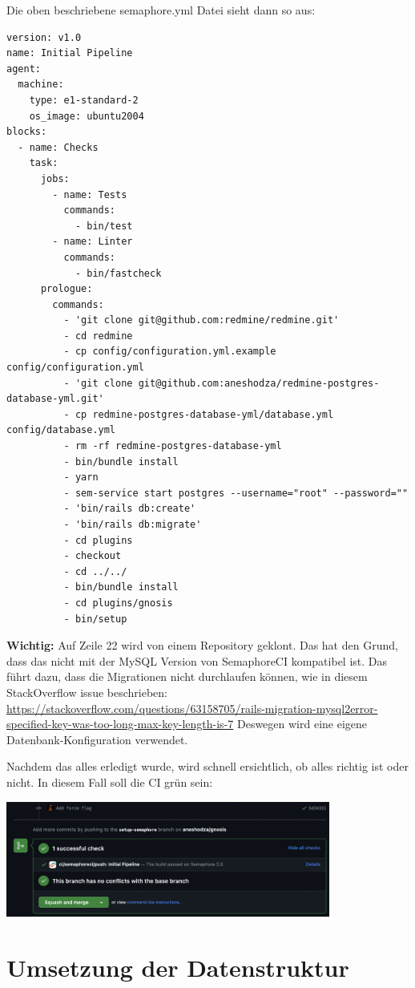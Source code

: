 \begin{minipage}{\textwidth}
  Die oben beschriebene semaphore.yml Datei sieht dann so aus:
  \begin{codebox}[]
    \begin{verbatim}
version: v1.0
name: Initial Pipeline
agent:
  machine:
    type: e1-standard-2
    os_image: ubuntu2004
blocks:
  - name: Checks
    task:
      jobs:
        - name: Tests
          commands:
            - bin/test
        - name: Linter
          commands:
            - bin/fastcheck
      prologue:
        commands:
          - 'git clone git@github.com:redmine/redmine.git'
          - cd redmine
          - cp config/configuration.yml.example config/configuration.yml
          - 'git clone git@github.com:aneshodza/redmine-postgres-database-yml.git'
          - cp redmine-postgres-database-yml/database.yml config/database.yml
          - rm -rf redmine-postgres-database-yml
          - bin/bundle install
          - yarn
          - sem-service start postgres --username="root" --password=""
          - 'bin/rails db:create'
          - 'bin/rails db:migrate'
          - cd plugins
          - checkout
          - cd ../../
          - bin/bundle install
          - cd plugins/gnosis
          - bin/setup
    \end{verbatim}
  \end{codebox}
  \textbf{Wichtig:} Auf Zeile 22 wird von einem Repository geklont. Das hat den Grund, dass das
   nicht mit der MySQL Version von SemaphoreCI kompatibel ist. Das führt dazu,
  dass die Migrationen nicht durchlaufen können, wie in diesem StackOverflow issue beschrieben: \newline
  \url{https://stackoverflow.com/questions/63158705/rails-migration-mysql2error-specified-key-was-too-long-max-key-length-is-7}
  \newline
  Deswegen wird eine eigene Datenbank-Konfiguration verwendet.
\end{minipage}

\begin{minipage}{\textwidth}
  Nachdem das alles erledigt wurde, wird schnell ersichtlich, ob alles richtig ist oder nicht. In diesem Fall soll die CI
  grün sein: \newline
  \begin{center}
    \includegraphics[width=0.8\textwidth]{images/misc/ci-passed.png}
    \label{fig:semaphore_ci_passed}
    \newline
  \end{center}
\end{minipage}

\section{Umsetzung der Datenstruktur}
